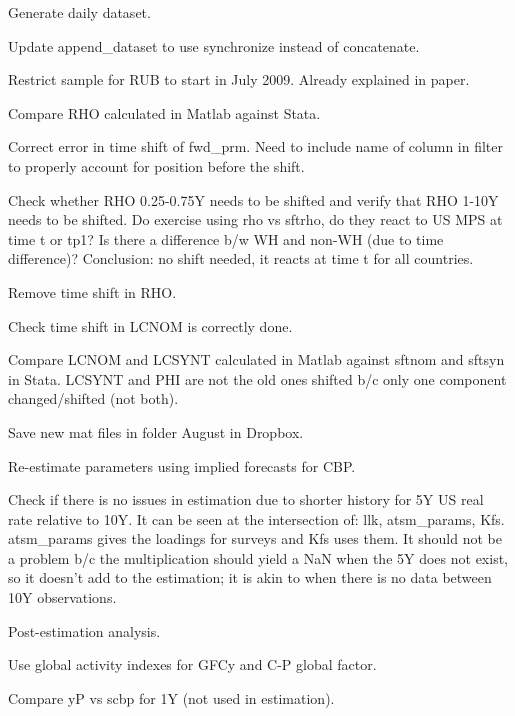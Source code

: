 \documentclass[12pt]{article}
\newcommand{\cmark}{\ding{51}}
\newcommand{\done}{\rlap{$\square$}{\raisebox{2pt}{\large\hspace{1pt}\cmark}}%
	\hspace{-2.5pt}}
\begin{document}
\begin{todolist}
	\item Generate daily dataset.
	\begin{todolist}
		\item[\done] Update append_dataset to use synchronize instead of concatenate.
		\item[\done] Restrict sample for RUB to start in July 2009. Already explained in paper.
		\item[\done] Compare RHO calculated in Matlab against Stata.
		\item[\done] Correct error in time shift of fwd_prm. Need to include name of column in filter to properly account for position before the shift.
		\item[\done] Check whether RHO 0.25-0.75Y needs to be shifted and verify that RHO 1-10Y needs to be shifted. Do exercise using rho vs sftrho, do they react to US MPS at time t or tp1? Is there a difference b/w WH and non-WH (due to time difference)? Conclusion: no shift needed, it reacts at time t for all countries.
		\item[\done] Remove time shift in RHO.
		\item[\done] Check time shift in LCNOM is correctly done.
		\item Compare LCNOM and LCSYNT calculated in Matlab against sftnom and sftsyn in Stata. LCSYNT and PHI are not the old ones shifted b/c only one component changed/shifted (not both).
		\item Save new mat files in folder August in Dropbox.
	\end{todolist}
	\item Re-estimate parameters using implied forecasts for CBP.
	\begin{todolist}
		\item[\done] Check if there is no issues in estimation due to shorter history for 5Y US real rate relative to 10Y. It can be seen at the intersection of: llk, atsm_params, Kfs. atsm_params gives the loadings for surveys and Kfs uses them. It should not be a problem b/c the multiplication should yield a NaN when the 5Y does not exist, so it doesn't add to the estimation; it is akin to when there is no data between 10Y observations.
	\end{todolist}
	\item Post-estimation analysis.
	\begin{todolist}
		\item Use global activity indexes for GFCy and C-P global factor.
		\item Compare yP vs scbp for 1Y (not used in estimation).

\end{todolist}
\end{todolist}
\end{document}
